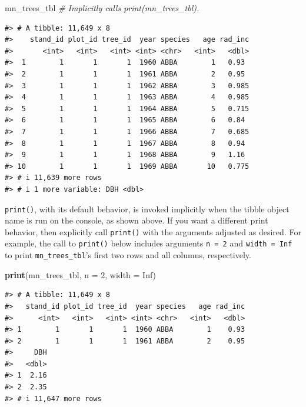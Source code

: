 \documentclass[
  11pt,
]{krantz}
\newenvironment{Shaded}{\begin{snugshade}}{\end{snugshade}}
\newcommand{\CommentTok}[1]{\textcolor[rgb]{0.56,0.35,0.01}{\textit{#1}}}
\newcommand{\DataTypeTok}[1]{\textcolor[rgb]{0.13,0.29,0.53}{#1}}
\newcommand{\DecValTok}[1]{\textcolor[rgb]{0.00,0.00,0.81}{#1}}
\newcommand{\KeywordTok}[1]{\textcolor[rgb]{0.13,0.29,0.53}{\textbf{#1}}}
\newcommand{\NormalTok}[1]{#1}
\newcommand{\OtherTok}[1]{\textcolor[rgb]{0.56,0.35,0.01}{#1}}
\theoremstyle{definition}
\theoremstyle{definition}
\theoremstyle{definition}
\theoremstyle{definition}
\theoremstyle{remark}
\begin{document}
\begin{Shaded}
\begin{Highlighting}[]
\NormalTok{mn\_trees\_tbl }\CommentTok{\# Implicitly calls print(mn\_trees\_tbl).}
\end{Highlighting}
\end{Shaded}

\begin{verbatim}
#> # A tibble: 11,649 x 8
#>    stand_id plot_id tree_id  year species   age rad_inc
#>       <int>   <int>   <int> <int> <chr>   <int>   <dbl>
#>  1        1       1       1  1960 ABBA        1   0.93 
#>  2        1       1       1  1961 ABBA        2   0.95 
#>  3        1       1       1  1962 ABBA        3   0.985
#>  4        1       1       1  1963 ABBA        4   0.985
#>  5        1       1       1  1964 ABBA        5   0.715
#>  6        1       1       1  1965 ABBA        6   0.84 
#>  7        1       1       1  1966 ABBA        7   0.685
#>  8        1       1       1  1967 ABBA        8   0.94 
#>  9        1       1       1  1968 ABBA        9   1.16 
#> 10        1       1       1  1969 ABBA       10   0.775
#> # i 11,639 more rows
#> # i 1 more variable: DBH <dbl>
\end{verbatim}

\texttt{print()}, with its default behavior, is invoked implicitly when the tibble object name is run on the console, as shown above. If you want a different print behavior, then explicitly call \texttt{print()} with the arguments adjusted as desired. For example, the call to \texttt{print()} below includes arguments \texttt{n\ =\ 2} and \texttt{width\ =\ Inf} to print \texttt{mn\_trees\_tbl}'s first two rows and all columns, respectively.

\begin{Shaded}
\begin{Highlighting}[]
\KeywordTok{print}\NormalTok{(mn\_trees\_tbl, }\DataTypeTok{n =} \DecValTok{2}\NormalTok{, }\DataTypeTok{width =} \OtherTok{Inf}\NormalTok{) }
\end{Highlighting}
\end{Shaded}

\begin{verbatim}
#> # A tibble: 11,649 x 8
#>   stand_id plot_id tree_id  year species   age rad_inc
#>      <int>   <int>   <int> <int> <chr>   <int>   <dbl>
#> 1        1       1       1  1960 ABBA        1    0.93
#> 2        1       1       1  1961 ABBA        2    0.95
#>     DBH
#>   <dbl>
#> 1  2.16
#> 2  2.35
#> # i 11,647 more rows
\end{verbatim}
\end{document}
